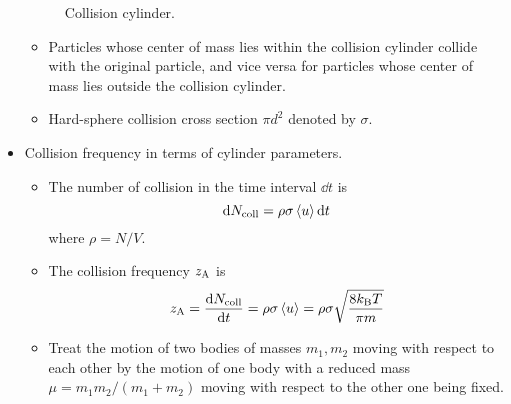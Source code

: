 \documentclass[../notes.tex]{subfiles}
\begin{document}
\begin{itemize}
\begin{figure}[h!]
        \caption{Collision cylinder.}
        \label{fig:collisionCylinder}
    \end{figure}
    \begin{itemize}
        \item Particles whose center of mass lies within the collision cylinder collide with the original particle, and vice versa for particles whose center of mass lies outside the collision cylinder.
        \item Hard-sphere collision cross section $\pi d^2$ denoted by $\sigma$.
    \end{itemize}
    \item Collision frequency in terms of cylinder parameters.
    \begin{itemize}
        \item The number of collision in the time interval $\dd{t}$ is
        \begin{equation*}
            \dd{N_\text{coll}} = \rho\sigma\left\langle{u}\right\rangle\dd{t}
        \end{equation*}
        where $\rho=N/V$.
        \item The collision frequency $z_{\ce{A}}$ is
        \begin{equation*}
            z_{\ce{A}} = \dv{N_\text{coll}}{t}
            = \rho\sigma\prb{u}
            = \rho\sigma\sqrt{\frac{8\kB T}{\pi m}}
        \end{equation*}
        \item Treat the motion of two bodies of masses $m_1,m_2$ moving with respect to each other by the motion of one body with a reduced mass $\mu=m_1m_2/(m_1+m_2)$ moving with respect to the other one being fixed.

\end{itemize}
\end{itemize}
\end{document}
